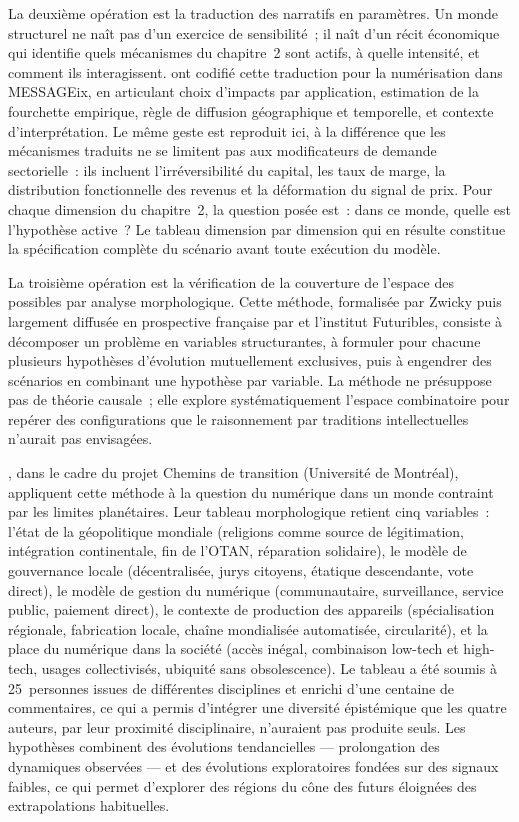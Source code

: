 La deuxième opération est la traduction des narratifs en paramètres. Un monde structurel ne naît pas d'un exercice de sensibilité~; il naît d'un récit économique qui identifie quels mécanismes du chapitre~2 sont actifs, à quelle intensité, et comment ils interagissent. \textcite{wilson_impacts_2026} ont codifié cette traduction pour la numérisation dans MESSAGEix, en articulant choix d'impacts par application, estimation de la fourchette empirique, règle de diffusion géographique et temporelle, et contexte d'interprétation. Le même geste est reproduit ici, à la différence que les mécanismes traduits ne se limitent pas aux modificateurs de demande sectorielle~: ils incluent l'irréversibilité du capital, les taux de marge, la distribution fonctionnelle des revenus et la déformation du signal de prix. Pour chaque dimension du chapitre~2, la question posée est~: dans ce monde, quelle est l'hypothèse active~? Le tableau dimension par dimension qui en résulte constitue la spécification complète du scénario avant toute exécution du modèle.

La troisième opération est la vérification de la couverture de l'espace des possibles par analyse morphologique. Cette méthode, formalisée par Zwicky puis largement diffusée en prospective française par \textcite{godet_creating_2006} et l'institut Futuribles, consiste à décomposer un problème en variables structurantes, à formuler pour chacune plusieurs hypothèses d'évolution mutuellement exclusives, puis à engendrer des scénarios en combinant une hypothèse par variable. La méthode ne présuppose pas de théorie causale~; elle explore systématiquement l'espace combinatoire pour repérer des configurations que le raisonnement par traditions intellectuelles n'aurait pas envisagées.

\textcite{deron_par_2025}, dans le cadre du projet Chemins de transition (Université de Montréal), appliquent cette méthode à la question du numérique dans un monde contraint par les limites planétaires. Leur tableau morphologique retient cinq variables~: l'état de la géopolitique mondiale (religions comme source de légitimation, intégration continentale, fin de l'OTAN, réparation solidaire), le modèle de gouvernance locale (décentralisée, jurys citoyens, étatique descendante, vote direct), le modèle de gestion du numérique (communautaire, surveillance, service public, paiement direct), le contexte de production des appareils (spécialisation régionale, fabrication locale, chaîne mondialisée automatisée, circularité), et la place du numérique dans la société (accès inégal, combinaison low-tech et high-tech, usages collectivisés, ubiquité sans obsolescence). Le tableau a été soumis à 25~personnes issues de différentes disciplines et enrichi d'une centaine de commentaires, ce qui a permis d'intégrer une diversité épistémique que les quatre auteurs, par leur proximité disciplinaire, n'auraient pas produite seuls. Les hypothèses combinent des évolutions tendancielles --- prolongation des dynamiques observées --- et des évolutions exploratoires fondées sur des signaux faibles, ce qui permet d'explorer des régions du cône des futurs éloignées des extrapolations habituelles.

